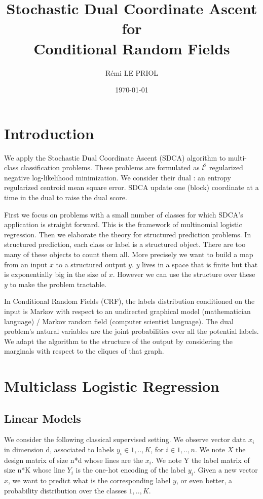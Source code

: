\documentclass{article}
\title{Stochastic Dual Coordinate Ascent \\ for \\ Conditional Random Fields}
\author{R\'emi LE PRIOL}
\date{\today}
\begin{document}
\maketitle

\section*{Introduction}

We apply the Stochastic Dual Coordinate Ascent (SDCA) algorithm to multi-class classification problems.
These problems are formulated as $l^2$ regularized negative log-likelihood minimization. 
We consider their dual : an entropy regularized centroid mean square error.
SDCA update one (block) coordinate at a time in the dual to raise the dual score.
  
First we focus on problems with a small number of classes for which SDCA's application is straight forward.
This is the framework of multinomial logistic regression.
Then we elaborate the theory for structured prediction problems.
In structured prediction, each class or label is a structured object.
There are too many of these objects to count them all.
More precisely we want to build a map from an input $x$ to a structured output $y$.
$y$ lives in a space that is finite but that is exponentially big in the size of $x$.
However we can use the structure over these $y$ to make the problem tractable.

In Conditional Random Fields (CRF), the labels distribution conditioned on the input is Markov with respect to an undirected graphical model (mathematician language) / Markov random field (computer scientist language). 
The dual problem's natural variables are the joint probabilities over all the potential labels.
We adapt the algorithm to the structure of the output by considering the marginals with respect to the cliques of that graph.

\section{Multiclass Logistic Regression}

\subsection{Linear Models}

We consider the following classical supervised setting.
We observe vector data $x_i$ in dimension d, associated to labels $y_i\in {1,..,K}$, for $i \in {1,..,n}$.
We note $X$ the design matrix of size n*d whose lines are the $x_i$.
We note Y the label matrix of size n*K whose line $Y_i$ is the one-hot encoding of the label $y_i$.
Given a new vector $x$, we want to predict what is the corresponding label $y$, or even better, a probability distribution over the classes ${1,..,K}$. 
\end{document}
